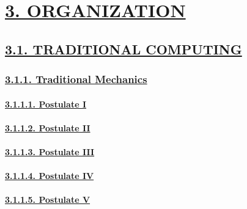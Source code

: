 \documentclass[
]{article}
\begin{document}
\hypertarget{organization}{%
\section{\texorpdfstring{\protect\hyperlink{organization-1}{3.
ORGANIZATION}}{3. ORGANIZATION}}\label{organization}}

\hypertarget{traditional-computing}{%
\subsection{\texorpdfstring{\protect\hyperlink{traditional-computing-1}{3.1.
TRADITIONAL
COMPUTING}}{3.1. TRADITIONAL COMPUTING}}\label{traditional-computing}}

\hypertarget{traditional-mechanics}{%
\subsubsection{\texorpdfstring{\protect\hyperlink{traditional-mechanics-1}{3.1.1.
Traditional
Mechanics}}{3.1.1. Traditional Mechanics}}\label{traditional-mechanics}}

\hypertarget{postulate-i}{%
\paragraph{\texorpdfstring{\protect\hyperlink{postulate-i-1}{3.1.1.1.
Postulate I}}{3.1.1.1. Postulate I}}\label{postulate-i}}

\hypertarget{postulate-ii}{%
\paragraph{\texorpdfstring{\protect\hyperlink{postulate-ii-1}{3.1.1.2.
Postulate II}}{3.1.1.2. Postulate II}}\label{postulate-ii}}

\hypertarget{postulate-iii}{%
\paragraph{\texorpdfstring{\protect\hyperlink{postulate-iii-1}{3.1.1.3.
Postulate III}}{3.1.1.3. Postulate III}}\label{postulate-iii}}

\hypertarget{postulate-iv}{%
\paragraph{\texorpdfstring{\protect\hyperlink{postulate-iv-1}{3.1.1.4.
Postulate IV}}{3.1.1.4. Postulate IV}}\label{postulate-iv}}

\hypertarget{postulate-v}{%
\paragraph{\texorpdfstring{\protect\hyperlink{postulate-v-1}{3.1.1.5.
Postulate V}}{3.1.1.5. Postulate V}}\label{postulate-v}}
\end{document}
